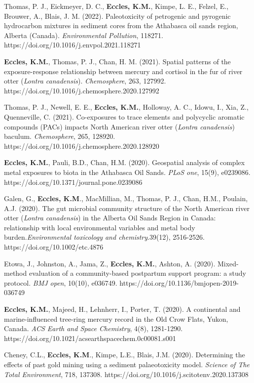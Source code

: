 \documentclass[margin,line]{res}
\begin{document}
\begin{resume}
Thomas, P. J., Eickmeyer, D. C., \textbf{Eccles, K.M.}, Kimpe, L. E., Felzel, E., Brouwer, A., Blais, J. M. (2022). Paleotoxicity of petrogenic and pyrogenic hydrocarbon mixtures in sediment cores from the Athabasca oil sands region, Alberta (Canada). \textit{Environmental Pollution}, 118271. \\
https://doi.org/10.1016/j.envpol.2021.118271

\textbf{Eccles, K.M.}, Thomas, P. J., Chan, H. M. (2021). Spatial patterns of the exposure-response relationship between mercury and cortisol in the fur of river otter (\textit{Lontra canadensis}). \textit{Chemosphere}, 263, 127992. https://doi.org/10.1016/j.chemosphere.2020.127992

Thomas, P. J., Newell, E. E., \textbf{Eccles, K.M.}, Holloway, A. C., Idowu, I., Xia, Z., Quenneville, C. (2021). Co-exposures to trace elements and polycyclic aromatic compounds (PACs) impacts North American river otter (\textit{Lontra canadensis}) baculum. \textit{Chemosphere}, 265, 128920.\\https://doi.org/10.1016/j.chemosphere.2020.128920

\textbf{Eccles, K.M.}, Pauli, B.D., Chan, H.M. (2020). Geospatial analysis of complex metal exposures to biota in the Athabasca Oil Sands. \textit{PLoS one}, 15(9), e0239086. \\https://doi.org/10.1371/journal.pone.0239086

Galen, G., \textbf{Eccles, K.M}., MacMillian, M., Thomas, P. J., Chan, H.M., Poulain, A.J. (2020). The gut microbial community structure of the North American river otter (\textit{Lontra canadensis}) in the Alberta Oil Sands Region in Canada: relationship with local environmental variables and metal body burden.\textit{Environmental toxicology and chemistry}.39(12), 2516-2526. https://doi.org/10.1002/etc.4876

Etowa, J., Johnston, A., Jama, Z., \textbf{Eccles, K.M.}, Ashton, A. (2020). Mixed-method evaluation of a community-based postpartum support program: a study protocol. \textit{BMJ open}, 10(10), e036749. https://doi.org/10.1136/bmjopen-2019-036749

\textbf{Eccles, K.M.}, Majeed, H., Lehnherr, I., Porter, T. (2020). A continental and marine-influenced tree-ring mercury record in the Old Crow Flats, Yukon, Canada. \textit{ACS Earth and Space Chemistry}, 4(8), 1281-1290. https://doi.org/10.1021/acsearthspacechem.0c00081.s001

Cheney, C.L., \textbf{Eccles, K.M}., Kimpe, L.E., Blais, J.M. (2020). Determining the effects of past gold mining using a sediment palaeotoxicity model. \textit{Science of The Total Environment}, 718, 137308. https://doi.org/10.1016/j.scitotenv.2020.137308


\end{resume}
\end{document}
